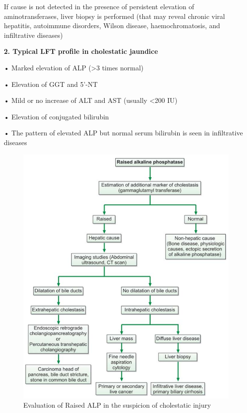 \documentclass[
  letterpaper,
  DIV=11,
  numbers=noendperiod]{scrreprt}
\begin{document}
If cause is not detected in the presence of persistent elevation of
aminotransferases, liver biopsy is performed (that may reveal chronic
viral hepatitis, autoimmune disorders, Wilson disease, haemochromatosis,
and infiltrative diseases)

\textbf{2. Typical LFT profile in cholestatic jaundice}

• Marked elevation of ALP (\textgreater3 times normal)

• Elevation of GGT and 5'-NT

• Mild or no increase of ALT and AST (usually \textless200 IU)

• Elevation of conjugated bilirubin

• The pattern of elevated ALP but normal serum bilirubin is seen in
infiltrative diseases

\begin{figure}

{\centering \includegraphics{image/cholestatic_injury.png}

}

\caption{Evaluation of Raised ALP in the suspicion of cholestatic
injury}

\end{figure}%
\end{document}
